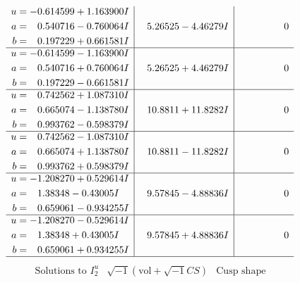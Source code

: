 \documentclass[1p]{elsarticle_modified}
\theoremstyle{definition}
\newcommand{\I}{\sqrt{-1}}
\begin{document}
$$\begin{array}{c|c|c}
\begin{aligned}
u &= -0.614599 + 1.163900 I \\
a &= \phantom{-}0.540716 - 0.760064 I \\
b &= \phantom{-}0.197229 + 0.661581 I\end{aligned}
 & \phantom{-}5.26525 - 4.46279 I & \phantom{-0.000000 } 0 \\ \hline\begin{aligned}
u &= -0.614599 - 1.163900 I \\
a &= \phantom{-}0.540716 + 0.760064 I \\
b &= \phantom{-}0.197229 - 0.661581 I\end{aligned}
 & \phantom{-}5.26525 + 4.46279 I & \phantom{-0.000000 } 0 \\ \hline\begin{aligned}
u &= \phantom{-}0.742562 + 1.087310 I \\
a &= \phantom{-}0.665074 - 1.138780 I \\
b &= \phantom{-}0.993762 - 0.598379 I\end{aligned}
 & \phantom{-}10.8811 + 11.8282 I & \phantom{-0.000000 } 0 \\ \hline\begin{aligned}
u &= \phantom{-}0.742562 - 1.087310 I \\
a &= \phantom{-}0.665074 + 1.138780 I \\
b &= \phantom{-}0.993762 + 0.598379 I\end{aligned}
 & \phantom{-}10.8811 - 11.8282 I & \phantom{-0.000000 } 0 \\ \hline\begin{aligned}
u &= -1.208270 + 0.529614 I \\
a &= \phantom{-}1.38348 - 0.43005 I \\
b &= \phantom{-}0.659061 - 0.934255 I\end{aligned}
 & \phantom{-}9.57845 - 4.88836 I & \phantom{-0.000000 } 0 \\ \hline\begin{aligned}
u &= -1.208270 - 0.529614 I \\
a &= \phantom{-}1.38348 + 0.43005 I \\
b &= \phantom{-}0.659061 + 0.934255 I\end{aligned}
 & \phantom{-}9.57845 + 4.88836 I & \phantom{-0.000000 } 0\\
 \hline 
 \end{array}$$\newpage$$\begin{array}{c|c|c}  
\text{Solutions to }I^u_{2}& \I (\text{vol} + \sqrt{-1}CS) & \text{Cusp shape}\\

\end{array}$$
\end{document}
